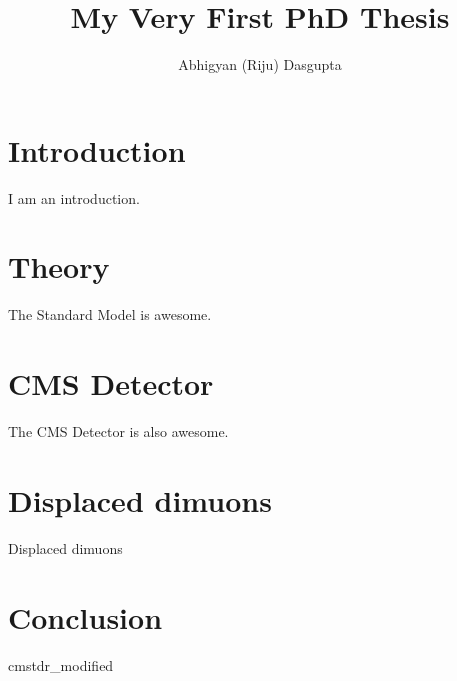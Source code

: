 \documentclass [PhD] {uclathes}
\title          {My Very First PhD Thesis}
\author         {Abhigyan (Riju) Dasgupta}
\begin{document}
\makeintropages


\chapter{Introduction}
I am an introduction.

\chapter{Theory}
The Standard Model is awesome.

\chapter{CMS Detector}
The CMS Detector is also awesome.

\chapter{Displaced dimuons}
Displaced dimuons



\chapter{Conclusion}



 {cmstdr_modified}
\end{document}
